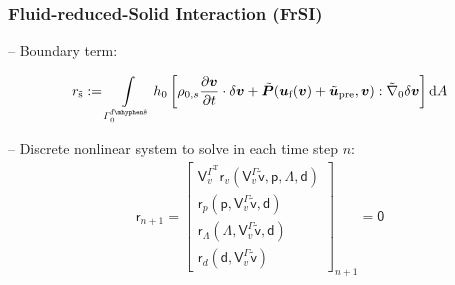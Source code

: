 \documentclass[a4paper,12pt]{report}
\newcommand{\fSr}{\tilde{\text{s}}}
\newcommand{\fF}{\text{f}}
\newcommand{\bs}[1]{\boldsymbol{#1}}
\newcommand{\Gm}{\mathit{\Gamma}}
\newcommand{\ROP}{\bs{\mathsf{r}}}
\newcommand{\LMZ}{\bs{\mathsf{\Lambda}}}
\begin{document}
\subsubsection{Fluid-reduced-Solid Interaction (FrSI)}\label{fluid-reduced-solid-interaction-frsi}


-- Boundary term:

\begin{align}
	r_{\fSr} := \int\limits_{\Gm_{0}^{\fF\mhyphen\fSr}} h_{0} \left[\rho_{0,s}\frac{\partial\bs{v}}{\partial t}\cdot\delta\bs{v} + \tilde{\bs{P}}(\bs{u}_{\fF}(\bs{v}) + \tilde{\bs{u}}_{\mathrm{pre}},\bs{v}) : \tilde{\nabla}_{0}\delta\bs{v}\right]\mathrm{d}A
\end{align}


-- Discrete nonlinear system to solve in each time step $n$:
\begin{equation}
\label{equation-nonlin-sys-frsi-0d}
\begin{aligned}
\ROP_{n+1} = \begin{bmatrix} \bs{\mathsf{V}}_{v}^{\Gm^\mathrm{T}}\ROP_{v}(\bs{\mathsf{V}}_{v}^{\Gm}\tilde{\bs{\mathsf{v}}},\bs{\mathsf{p}},\LMZ,\bs{\mathsf{d}}) \\ \ROP_{p}(\bs{\mathsf{p}},\bs{\mathsf{V}}_{v}^{\Gm}\tilde{\bs{\mathsf{v}}},\bs{\mathsf{d}}) \\ \ROP_{\mathit{\Lambda}}(\LMZ,\bs{\mathsf{V}}_{v}^{\Gm}\tilde{\bs{\mathsf{v}}},\bs{\mathsf{d}}) \\ \ROP_{d}(\bs{\mathsf{d}},\bs{\mathsf{V}}_{v}^{\Gm}\tilde{\bs{\mathsf{v}}}) \end{bmatrix}_{n+1} = \bs{\mathsf{0}}
\end{aligned}
\end{equation}
\end{document}
